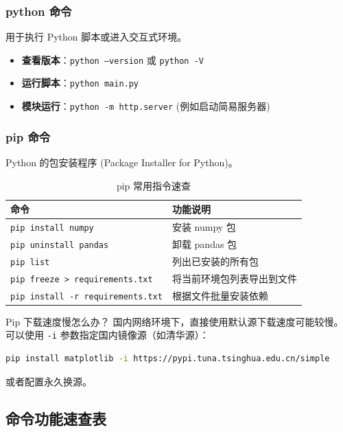 \documentclass[12pt, a4paper]{article}
\begin{document}
\subsubsection{python 命令}
用于执行 Python 脚本或进入交互式环境。

\begin{itemize}
    \item \textbf{查看版本}：\texttt{python --version} 或 \texttt{python -V}
    \item \textbf{运行脚本}：\texttt{python main.py}
    \item \textbf{模块运行}：\texttt{python -m http.server} (例如启动简易服务器)
\end{itemize}

\subsubsection{pip 命令}
Python 的包安装程序 (Package Installer for Python)。

\begin{table}[ht]
\centering
\begin{tabular}{lp{8cm}}
\toprule
\textbf{命令} & \textbf{功能说明} \\
\midrule
\texttt{pip install numpy} & 安装 numpy 包 \\
\texttt{pip uninstall pandas} & 卸载 pandas 包 \\
\texttt{pip list} & 列出已安装的所有包 \\
\texttt{pip freeze > requirements.txt} & 将当前环境包列表导出到文件 \\
\texttt{pip install -r requirements.txt} & 根据文件批量安装依赖 \\
\bottomrule
\end{tabular}
\caption{pip 常用指令速查}
\end{table}

\begin{importantbox}{Pip 下载速度慢怎么办？}
国内网络环境下，直接使用默认源下载速度可能较慢。可以使用 \texttt{-i} 参数指定国内镜像源（如清华源）：
\begin{lstlisting}[language=bash, basicstyle=\ttfamily\footnotesize, breaklines=true]
pip install matplotlib -i https://pypi.tuna.tsinghua.edu.cn/simple
\end{lstlisting}
或者配置永久换源。
\end{importantbox}

\subsection{命令功能速查表}
\end{document}
